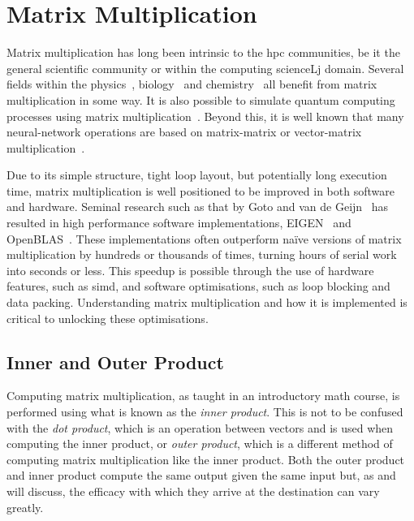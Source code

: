 \documentclass[\main/thesis.tex]{subfiles}
\begin{document}
\chapter{Matrix Multiplication}
\label{cha:matmul}
Matrix multiplication has long been intrinsic to the \gls{hpc} communities, be it the general scientific community or within the computing scienceLj domain.
Several fields within the physics~\autocite{krol2014matrix}, biology~\autocite{akutsu2000algorithms} and chemistry~\autocite{weber2015semiempirical} all benefit from matrix multiplication in some way.
It is also possible to simulate quantum computing processes using matrix multiplication~\autocite{zulehner2019matrix}.
Beyond this, it is well known that many neural-network operations are based on matrix-matrix or vector-matrix multiplication~\autocite{rojas1996neural,blue1992training}.

Due to its simple structure, tight loop layout, but potentially long execution time, matrix multiplication is well positioned to be improved in both software and hardware.
Seminal research such as that by Goto and van de Geijn~\autocite{goto2008anatomy} has resulted in high performance software implementations, \eg EIGEN~\autocite{guennebaud2021eigen} and OpenBLAS~\autocite{xianyi2012model}.
These implementations often outperform na\"ive versions of matrix multiplication by hundreds or thousands of times, turning hours of serial work into seconds or less.
This speedup is possible through the use of hardware features, such as \gls{simd}, and software optimisations, such as loop blocking and data packing.
Understanding matrix multiplication and how it is implemented is critical to unlocking these optimisations.

\section{Inner and Outer Product}
\label{sec:products}

Computing matrix multiplication, as taught in an introductory math course, is performed using what is known as the \emph{inner product}.
This is not to be confused with the \emph{dot product}, which is an operation between vectors and is used when computing the inner product, or \emph{outer product}, which is a different method of computing matrix multiplication like the inner product.
Both the outer product and inner product compute the same output given the same input but, as  and  will discuss, the efficacy with which they arrive at the destination can vary greatly.
\end{document}

